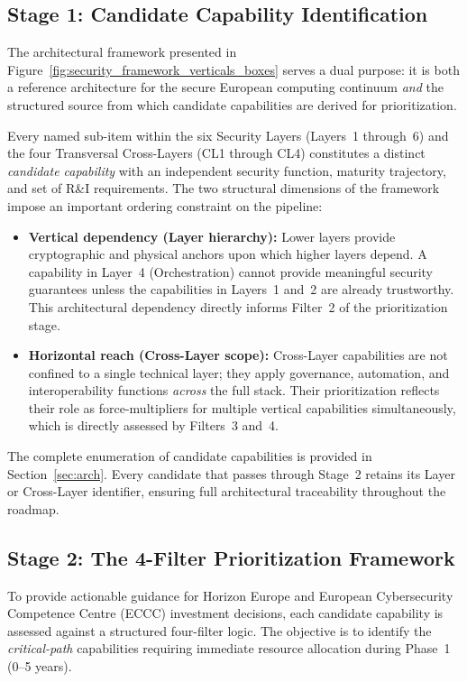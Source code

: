 \documentclass{ieeeaccess}
\begin{document}
\subsection{Stage 1: Candidate Capability Identification}
\label{sec:capability_identification}
The architectural framework presented in
Figure~\ref{fig:security_framework_verticals_boxes} serves a dual purpose:
it is both a reference architecture for the secure European computing
continuum \emph{and} the structured source from which candidate capabilities
are derived for prioritization.

Every named sub-item within the six Security Layers (Layers~1 through~6) and
the four Transversal Cross-Layers (CL1 through CL4) constitutes a distinct
\emph{candidate capability} with an independent security function, maturity
trajectory, and set of R\&I requirements. The two structural dimensions of
the framework impose an important ordering constraint on the pipeline:

\begin{itemize}
    \item \textbf{Vertical dependency (Layer hierarchy):} Lower layers provide
    cryptographic and physical anchors upon which higher layers depend. A
    capability in Layer~4 (Orchestration) cannot provide meaningful security
    guarantees unless the capabilities in Layers~1 and~2 are already
    trustworthy. This architectural dependency directly informs Filter~2
    of the prioritization stage.

    \item \textbf{Horizontal reach (Cross-Layer scope):} Cross-Layer
    capabilities are not confined to a single technical layer; they apply
    governance, automation, and interoperability functions \emph{across} the
    full stack. Their prioritization reflects their role as force-multipliers
    for multiple vertical capabilities simultaneously, which is directly
    assessed by Filters~3 and~4.
\end{itemize}

The complete enumeration of candidate capabilities is provided in
Section~\ref{sec:arch}. Every candidate that passes through Stage~2
retains its Layer or Cross-Layer identifier, ensuring full architectural
traceability throughout the roadmap.

\subsection{Stage 2: The 4-Filter Prioritization Framework}
\label{sec:filters}
To provide actionable guidance for Horizon Europe and European Cybersecurity
Competence Centre (ECCC) investment decisions, each candidate capability is
assessed against a structured four-filter logic. The objective is to identify
the \emph{critical-path} capabilities requiring immediate resource allocation
during Phase~1 (0--5 years).
\end{document}
